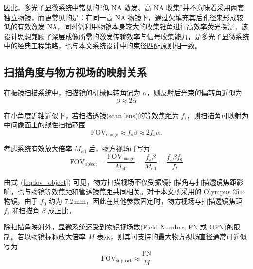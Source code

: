因此，多光子显微系统中常见的``低 NA 激发、高 NA 收集''并不意味着采用两套独立物镜，而更常见的是：在同一高 NA 物镜下，通过欠填充其后孔径来形成较低的有效激发 NA，同时仍利用物镜本身较大的收集锥角进行高效率荧光探测。该设计思想兼顾了深层成像所需的激发传输效率与信号收集能力，是多光子显微系统中的经典工程策略，也与本文系统设计中的束径匹配原则相一致。




\subsection{扫描角度与物方视场的映射关系}\label{2.4.3}

在振镜扫描系统中，扫描镜的机械偏转角记为 $\alpha$，则反射后光束的偏转角近似为
\begin{equation}
  \beta \approx 2\alpha
  \label{eq:beta_alpha}
\end{equation}

在小角度近轴近似下，若扫描透镜(scan lens)的等效焦距为 $f_s$，则扫描角可映射为中间像面上的线性扫描范围
\begin{equation}
  \mathrm{FOV}_{\mathrm{image}}\approx f_s\beta \approx 2f_s\alpha.
  \label{eq:fov_image}
\end{equation}

考虑系统有效放大倍率 $M_{\mathrm{eff}}$ 后，物方视场可写为
\begin{equation}
  \mathrm{FOV}_{\mathrm{object}}
  =\frac{\mathrm{FOV}_{\mathrm{image}}}{M_{\mathrm{eff}}}
  =\frac{f_s\beta}{M_{\mathrm{eff}}}
  =\frac{f_s\beta f_0}{f_t}
  \label{eq:fov_object}
\end{equation}

由式~(\ref{eq:fov_object}) 可见，物方扫描视场不仅受振镜扫描角与扫描透镜焦距影响，也与物镜等效焦距和管透镜焦距共同相关。对于本文所采用的 Olympus 25$\times$ 物镜，由于 $f_0$ 约为 7.2\,mm，因此在其他参数固定时，物方视场与扫描透镜焦距 $f_s$ 和扫描角 $\beta$ 成正比。

除扫描角映射外，显微系统还受到物镜视场数(Field Number, FN 或 OFN)的限制。若以物镜标称放大倍率 $M$ 表示，则其可支持的最大物方视场直径通常可近似写为
\begin{equation}
  \mathrm{FOV}_{\mathrm{support}}\approx \frac{\mathrm{FN}}{M}
  \label{eq:fov_support}
\end{equation}


